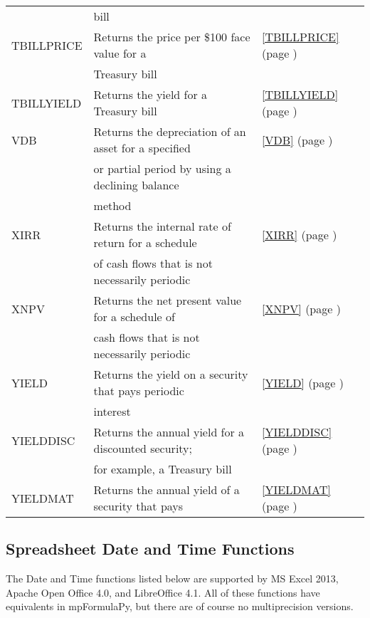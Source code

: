 \begin{center}
\begin{longtable}{l l l }
		& bill  &   \\
		TBILLPRICE & Returns the price per \$100 face value for a  &  \ref{TBILLPRICE} (page \pageref{TBILLPRICE}) \index{Spreadsheet Functions!TBILLPRICE} \\
		& Treasury bill  &   \\		
		TBILLYIELD & Returns the yield for a Treasury bill &  \ref{TBILLYIELD} (page \pageref{TBILLYIELD}) \index{Spreadsheet Functions!TBILLYIELD} \\
		VDB   & Returns the depreciation of an asset for a specified &  \ref{VDB} (page \pageref{VDB}) \index{Spreadsheet Functions!VDB} \\
		& or partial period by using a declining balance  &   \\
		& method  &   \\		
		XIRR  & Returns the internal rate of return for a schedule &  \ref{XIRR} (page \pageref{XIRR}) \index{Spreadsheet Functions!XIRR} \\
		& of cash flows that is not necessarily periodic &   \\
		XNPV  & Returns the net present value for a schedule of &  \ref{XNPV} (page \pageref{XNPV}) \index{Spreadsheet Functions!XNPV} \\
		& cash flows that is not necessarily periodic &   \\
		YIELD & Returns the yield on a security that pays periodic &  \ref{YIELD} (page \pageref{YIELD}) \index{Spreadsheet Functions!YIELD} \\
		& interest &   \\
		YIELDDISC & Returns the annual yield for a discounted security; &  \ref{YIELDDISC} (page \pageref{YIELDDISC}) \index{Spreadsheet Functions!YIELDDISC} \\
		& for example, a Treasury bill &  \\
		YIELDMAT & Returns the annual yield of a security that pays &  \ref{YIELDMAT} (page \pageref{YIELDMAT}) \index{Spreadsheet Functions!YIELDMAT} \\
	\end{longtable}
\end{center}





\newpage 
\subsection{Spreadsheet Date and Time Functions}
The Date and Time functions listed below are supported by MS Excel 2013, Apache Open Office 4.0, and LibreOffice 4.1. 
All of these functions have equivalents in mpFormulaPy, but there are of course no multiprecision versions. 





